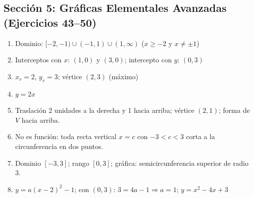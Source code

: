 \documentclass[12pt, letterpaper]{article}
\begin{document}
  \subsection*{Sección 5: Gráficas Elementales Avanzadas (Ejercicios 43--50)}
  \begin{enumerate}[resume=respuestas, leftmargin=*, label=\textbf{\arabic*.}]
    \item Dominio: $[-2, -1) \cup (-1, 1) \cup (1, \infty)$ \quad ($x \ge -2$ y $x \neq \pm 1$)
    \item Interceptos con $x$: $(1, 0)$ y $(3, 0)$; \quad intercepto con $y$: $(0, 3)$
    \item $x_v = 2$, $y_v = 3$; \quad vértice $(2, 3)$ (máximo)
    \item $y = 2x$
    \item Traslación 2 unidades a la derecha y 1 hacia arriba; vértice $(2, 1)$; forma de $V$ hacia arriba.
    \item No es función: toda recta vertical $x = c$ con $-3 < c < 3$ corta a la circunferencia en dos puntos.
    \item Dominio $[-3, 3]$; rango $[0, 3]$; gráfica: semicircunferencia superior de radio 3.
    \item $y = a(x - 2)^2 - 1$; con $(0, 3)$: $3 = 4a - 1 \Rightarrow a = 1$; \quad $y = x^2 - 4x + 3$
  \end{enumerate}
\fi
\end{document}
